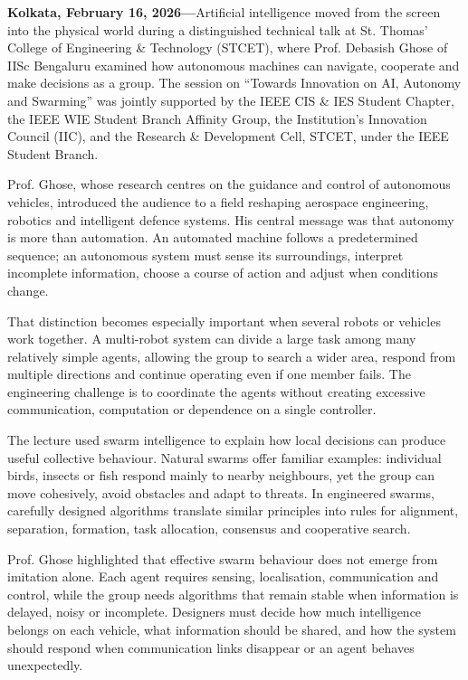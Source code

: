 {\small
\noindent
\textbf{Kolkata, February 16, 2026---}Artificial intelligence moved from the screen into the physical world during a distinguished technical talk at St. Thomas' College of Engineering \& Technology (STCET), where Prof. Debasish Ghose of IISc Bengaluru examined how autonomous machines can navigate, cooperate and make decisions as a group. The session on ``Towards Innovation on AI, Autonomy and Swarming'' was jointly supported by the IEEE CIS \& IES Student Chapter, the IEEE WIE Student Branch Affinity Group, the Institution's Innovation Council (IIC), and the Research \& Development Cell, STCET, under the IEEE Student Branch.

\medskip
\noindent
Prof. Ghose, whose research centres on the guidance and control of autonomous vehicles, introduced the audience to a field reshaping aerospace engineering, robotics and intelligent defence systems. His central message was that autonomy is more than automation. An automated machine follows a predetermined sequence; an autonomous system must sense its surroundings, interpret incomplete information, choose a course of action and adjust when conditions change.

\medskip
\noindent
That distinction becomes especially important when several robots or vehicles work together. A multi-robot system can divide a large task among many relatively simple agents, allowing the group to search a wider area, respond from multiple directions and continue operating even if one member fails. The engineering challenge is to coordinate the agents without creating excessive communication, computation or dependence on a single controller.

\medskip
\noindent
The lecture used swarm intelligence to explain how local decisions can produce useful collective behaviour. Natural swarms offer familiar examples: individual birds, insects or fish respond mainly to nearby neighbours, yet the group can move cohesively, avoid obstacles and adapt to threats. In engineered swarms, carefully designed algorithms translate similar principles into rules for alignment, separation, formation, task allocation, consensus and cooperative search.

\medskip
\noindent
Prof. Ghose highlighted that effective swarm behaviour does not emerge from imitation alone. Each agent requires sensing, localisation, communication and control, while the group needs algorithms that remain stable when information is delayed, noisy or incomplete. Designers must decide how much intelligence belongs on each vehicle, what information should be shared, and how the system should respond when communication links disappear or an agent behaves unexpectedly.

}
